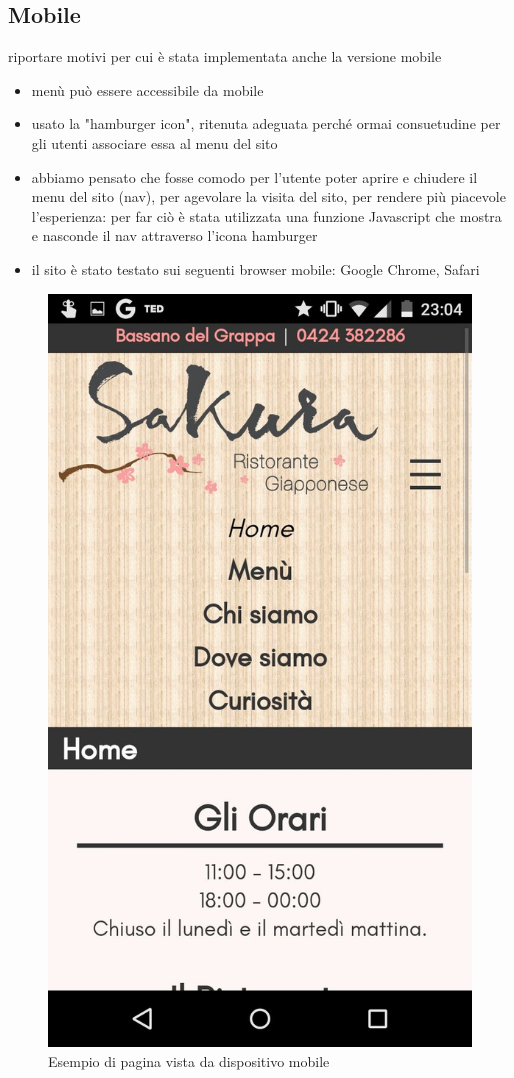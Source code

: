 \documentclass[../relazione.tex]{subfiles}
\begin{document}
	\subsection{Mobile}
	riportare motivi per cui è stata implementata anche la versione mobile
	\begin{itemize}
		\item menù può essere accessibile da mobile
		\item usato la "hamburger icon", ritenuta adeguata perché ormai consuetudine per gli utenti associare essa al menu del sito
		\item abbiamo pensato che fosse comodo per l'utente poter aprire e chiudere il menu del sito (nav), per agevolare la visita del sito, per rendere più piacevole l'esperienza: per far ciò è stata utilizzata una funzione Javascript che mostra e nasconde il nav attraverso l'icona hamburger
		\item il sito è stato testato sui seguenti browser mobile: Google Chrome, Safari
	\end{itemize}
	\begin{figure}[H]
		\centering
		\includegraphics[scale=0.2]{images/mobile2}
		\caption{Esempio di pagina vista da dispositivo mobile}
		\label{fig:Esempio di pagina vista da dispositivo mobile}
	\end{figure}
\end{document}
